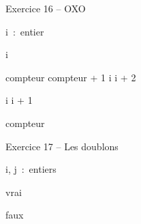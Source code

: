 \begin{Emphase}{Exercice 16 -- OXO}

\begin{pseudoN}


    \Decl i~:~entier

    \Let i 


            \Let compteur \Gets compteur + 1
            \Let i \Gets i + 2

        \EndIf

        \Let i \Gets i + 1

    \EndWhile

    \Write compteur

\EndModule

\end{pseudoN}

\end{Emphase}


\begin{Emphase}{Exercice 17 -- Les doublons}

\begin{pseudoN}


    \Decl i, j~:~entiers



                
                \Return vrai

            \EndIf

        \EndFor

    \EndFor

    \Return faux

\EndModule

\end{pseudoN}

\end{Emphase}

\newpage

